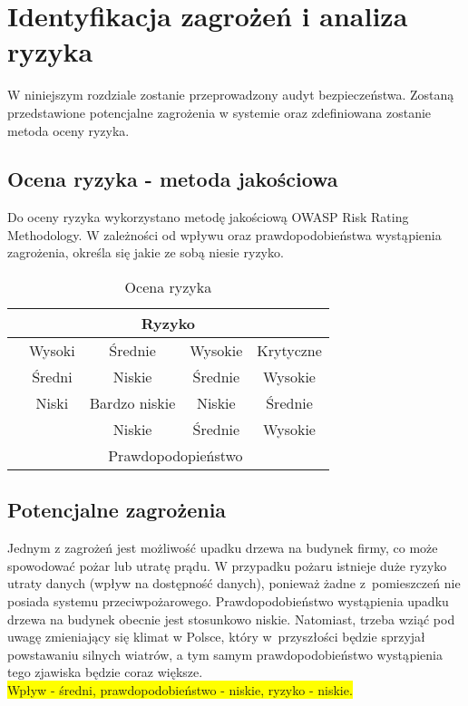 \newpage\section{Identyfikacja zagrożeń \newline i analiza ryzyka}
W niniejszym rozdziale zostanie przeprowadzony audyt bezpieczeństwa. Zostaną przedstawione potencjalne zagrożenia w systemie oraz zdefiniowana zostanie metoda oceny ryzyka.

\subsection{Ocena ryzyka - metoda jakościowa}
Do oceny ryzyka wykorzystano metodę jakościową OWASP Risk Rating Methodology. W zależności od wpływu oraz prawdopodobieństwa wystąpienia zagrożenia, określa się jakie ze sobą niesie ryzyko. 
\begin{table}[!ht]
	\centering
	\caption{Ocena ryzyka}
	\label{ocenaRyzyka}
	\begin{tabular}{|c|c|c|c|c|}
		\hline 
		\multicolumn{5}{|c|}{Ryzyko}        \\ \hline
		\multirow{4}{*}{} & Wysoki  & \cellcolor{orange} Średnie     &\cellcolor{red}  Wysokie   & \cellcolor{pink} Krytyczne     \\ \cline{2-5} 
		Wpływ	  & Średni  & \cellcolor{yellow} Niskie    	 & \cellcolor{orange} Średnie    & \cellcolor{red}  Wysokie   \\ \cline{2-5}
		& Niski   & \cellcolor{green} Bardzo niskie &  \cellcolor{yellow} Niskie     & \cellcolor{orange} Średnie    \\ \cline{2-5}
		&     	& Niskie   			& Średnie    &  Wysokie    \\ \hline
		& \multicolumn{4}{c|}{Prawdopodopieństwo}  \\  \hline 
	\end{tabular}
\end{table}

\subsection{Potencjalne zagrożenia}
Jednym z zagrożeń jest możliwość upadku drzewa na budynek firmy, co może spowodować pożar lub utratę prądu. W przypadku pożaru istnieje duże ryzyko utraty danych (wpływ na dostępność danych), ponieważ żadne z~pomieszczeń nie posiada systemu przeciwpożarowego.  Prawdopodobieństwo wystąpienia upadku drzewa na budynek obecnie jest stosunkowo niskie. Natomiast, trzeba wziąć pod uwagę zmieniający się klimat w Polsce, który w~przyszłości będzie sprzyjał powstawaniu silnych wiatrów, a tym samym prawdopodobieństwo wystąpienia tego zjawiska będzie coraz większe. \\ \colorbox{yellow}{Wpływ - średni, prawdopodobieństwo - niskie, ryzyko - niskie.}

